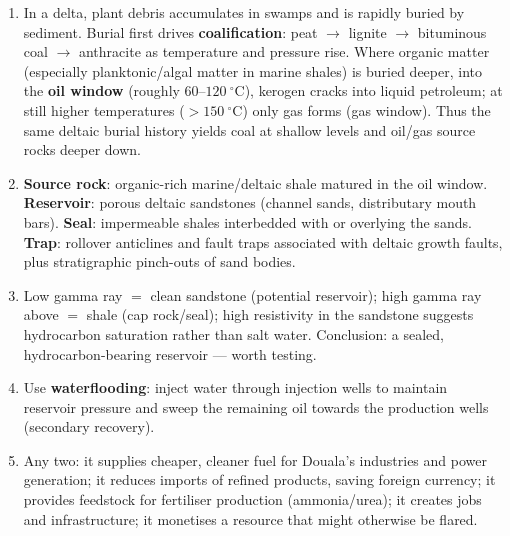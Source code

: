 \documentclass[11pt]{article}
\begin{document}
\begin{corrige}[Integration 4]
\begin{enumerate}
\item In a delta, plant debris accumulates in swamps and is rapidly buried by sediment. Burial first drives \textbf{coalification}: peat $\rightarrow$ lignite $\rightarrow$ bituminous coal $\rightarrow$ anthracite as temperature and pressure rise. Where organic matter (especially planktonic/algal matter in marine shales) is buried deeper, into the \textbf{oil window} (roughly $60$--$120\ ^{\circ}\mathrm{C}$), kerogen cracks into liquid petroleum; at still higher temperatures ($>150\ ^{\circ}\mathrm{C}$) only gas forms (gas window). Thus the same deltaic burial history yields coal at shallow levels and oil/gas source rocks deeper down.
\item \textbf{Source rock}: organic-rich marine/deltaic shale matured in the oil window. \textbf{Reservoir}: porous deltaic sandstones (channel sands, distributary mouth bars). \textbf{Seal}: impermeable shales interbedded with or overlying the sands. \textbf{Trap}: rollover anticlines and fault traps associated with deltaic growth faults, plus stratigraphic pinch-outs of sand bodies.
\item Low gamma ray $=$ clean sandstone (potential reservoir); high gamma ray above $=$ shale (cap rock/seal); high resistivity in the sandstone suggests hydrocarbon saturation rather than salt water. Conclusion: a sealed, hydrocarbon-bearing reservoir — worth testing.
\item Use \textbf{waterflooding}: inject water through injection wells to maintain reservoir pressure and sweep the remaining oil towards the production wells (secondary recovery).
\item Any two: it supplies cheaper, cleaner fuel for Douala's industries and power generation; it reduces imports of refined products, saving foreign currency; it provides feedstock for fertiliser production (ammonia/urea); it creates jobs and infrastructure; it monetises a resource that might otherwise be flared.
\end{enumerate}
\end{corrige}
\end{document}
